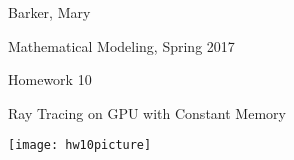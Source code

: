 \documentclass[11pt]{article}
\def \hwnum{10}
\def \hwdescription{Ray Tracing on GPU with Constant Memory}
\def \hwscript{hw10.cu}
\begin{document}
{\color{white}{thing}}
\begin{center}
{
	\fontsize{20pt}{20pt}\selectfont
	Barker, Mary
}

\vspace{1cm}

{
	\fontsize{20pt}{20pt}\selectfont
	Mathematical Modeling, Spring 2017
}

\vspace{1cm}

{
	\fontsize{20pt}{20pt}\selectfont
	Homework \hwnum
}

\vspace{1cm}

{
	\fontsize{20pt}{20pt}\selectfont
	\hwdescription
}

\end{center}
\pagebreak
\begin{center}
\texttt{[image: hw10picture]}
\end{center}
\pagebreak

\end{document}
